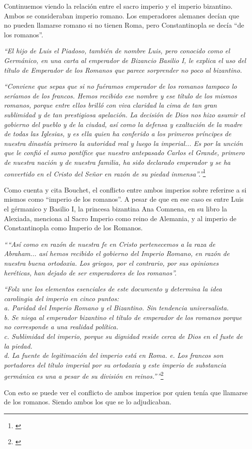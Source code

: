 Continuemos viendo la relación entre el sacro imperio y
el imperio bizantino. Ambos se consideraban imperio romano.
Los emperadores alemanes decían que no pueden llamarse romano
si no tienen Roma, pero Constantinopla se decía ``de los
romanos''.

\textit{``El hijo de Luis el Piadoso, también de nombre Luis,
	pero conocido como el Germánico, en una carta al
	emperador de Bizancio Basilio I, le explica el uso del
	título de Emperador de los Romanos que parece sorprender
	no poco al bizantino.}

\textit{``Conviene que sepas que si no fuéramos emperador de los
	romanos tampoco lo seríamos de los francos. Hemos recibido
	ese nombre y ese título de los mismos romanos, porque
	entre ellos brilló con viva claridad la cima de tan gran
	sublimidad y de tan prestigiosa apelación.
	La decisión de Dios nos hizo asumir el gobierno del pueblo
	y de la ciudad, así como la defensa y exaltación de la madre
	de todas las Iglesias, y es ella quien ha conferido a los
	primeros príncipes de nuestra dinastía primero la autoridad
	real y luego la imperial...
	Es por la unción que le confió el sumo pontífice que
	nuestro antepasado Carlos el Grande, primero de nuestra
	nación y de nuestra familia, ha sido declarado emperador
	y se ha convertido en el Cristo del Señor en razón
	de su piedad inmensa''.''}\footnote{\cite[p.~846]{ciudad}}

Como cuenta y cita Bouchet, el conflicto entre ambos imperios
sobre referirse a si mismos como ``imperio de los romanos''.
A pesar de que en ese caso es entre Luis el gérmanico y
Basilio I, la princesa bizantina Ana Comnena, en su libro
la Alexiada, menciona al Sacro Imperio como reino de Alemania,
y al imperio de Constantinopla como Imperio de los Romanos.

\textit{
	````Así como en razón de nuestra fe en Cristo pertenecemos
	a la raza de Abraham... así hemos recibido el gobierno del
	Imperio Romano, en razón de nuestra buena ortodoxia.
	Los griegos, por el contrario, por sus opiniones heréticas,
	han dejado de ser emperadores de los romanos''.}

\textit{
	``Folz une los elementos esenciales de este documento
	y determina la idea carolingia del imperio
	en cinco puntos:\\
	a. Paridad del Imperio Romano y el Bizantino. Sin
	tendencia universalista.\\
	b. Se niega al emperador bizantino el título de emperador
	de los romanos porque no corresponde a una realidad política.\\
	c. Sublimidad del imperio, porque su dignidad reside cerca de
	Dios en el fuste de la piedad.\\
	d. La fuente de legitimación del imperio está en Roma.
	e. Los francos son portadores del título imperial por su
	ortodoxia y este imperio de substancia germánica es una a
	pesar de su división en reinos.''''}\footnote{\cite[p.~846-847]{ciudad}}

Con esto se puede ver el conflicto de ambos imperios por
quien tenía que llamarse de los romanos. Siendo ambos los
que se lo adjudicaban.


















